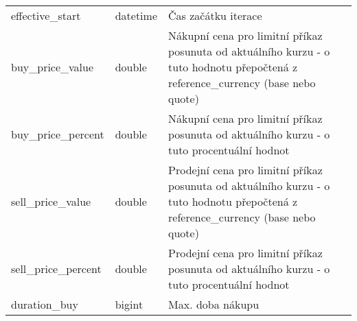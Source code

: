 \begin{center}
\begin{longtable}[t]{|l|C{4cm}|p{4cm}|}
        effective\_start                     & datetime                                                                                                                                                                                                             & Čas začátku iterace                                                                                                               \\
        buy\_price\_value                    & double                                                                                                                                                                                                               & Nákupní cena pro limitní příkaz posunuta od aktuálního kurzu - o tuto hodnotu přepočtená z reference\_currency (base nebo quote)  \\
        buy\_price\_percent                  & double                                                                                                                                                                                                               & Nákupní cena pro limitní příkaz posunuta od aktuálního kurzu - o tuto procentuální hodnot                                         \\
        sell\_price\_value                   & double                                                                                                                                                                                                               & Prodejní cena pro limitní příkaz posunuta od aktuálního kurzu - o tuto hodnotu přepočtená z reference\_currency (base nebo quote) \\
        sell\_price\_percent                 & double                                                                                                                                                                                                               & Prodejní cena pro limitní příkaz posunuta od aktuálního kurzu - o tuto procentuální hodnot                                        \\
        duration\_buy                        & bigint                                                                                                                                                                                                               & Max. doba nákupu                                                                                                                  \\

\end{longtable}
\end{center}
